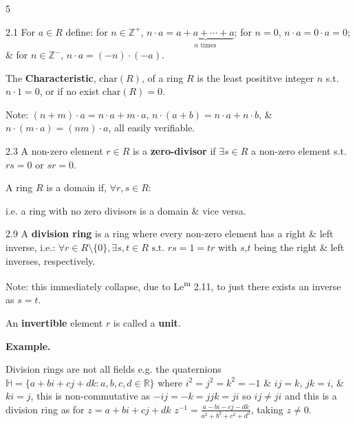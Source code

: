 \documentclass[8pt]{extarticle}
\newcommand{\fitdisplay}[1]{%
  \par\vspace{-1pt}\noindent
  \sbox{\fitdisplaybox}{#1}%
  \makebox[\columnwidth][c]{%
    \ifdim\wd\fitdisplaybox>\columnwidth
      \resizebox{\columnwidth}{!}{#1}%
    \else
      \usebox{\fitdisplaybox}%
    \fi
  }%
  \par\vspace{-1pt}%
}
\newenvironment{example}{%
  \par\noindent
  \textbf{Example.}\ \normalfont
  \ignorespaces
}{%
  \par
}
\begin{document}
\begin{multicols}{5}
        \begin{definition}{2.1}
            For \(a\in R\) define: for \(n\in\mathbb{Z}^+\), \(n\cdot a=\underbrace{a+a+\cdots+a}_{n\text{ times}}\); for \(n=0\), \(n\cdot a=0\cdot a=0\); \& for \(n\in\mathbb{Z}^-\), \(n\cdot a=(-n)\cdot(-a)\).
            
            The \textbf{Characteristic}, \(\text{char}(R)\), of a ring \(R\) is the least posititve integer \(n\) s.t. \(n\cdot 1=0\), or if no exist \(\text{char}(R)=0\).
            
            {\footnotesize Note: \((n+m)\cdot a=n\cdot a+m\cdot a\), \(n\cdot(a+b)=n\cdot a+n\cdot b\), \& \(n\cdot(m\cdot a)=(nm)\cdot a\), all easily verifiable.}
        \end{definition}

        \begin{definition}{2.3}
            A non-zero element \(r\in R\) is a \textbf{zero-divisor} if \(\exists s\in R\) a non-zero element s.t. \(rs=0\) or \(sr=0\).

            A ring \(R\) is a domain if, \(\forall r,s\in R\):

            \fitdisplay{\(rs=0\implies r=0 \text{ or } s=0.\)}

            i.e. a ring with no zero divisors is a domain \& vice versa.
        \end{definition}

        \begin{definition}{2.9}
            A \textbf{division ring} is a ring where every non-zero element has a right \& left inverse, i.e.: \(\forall r\in R\setminus\{0\},\exists s,t\in R\text{ s.t. }rs=1=tr\) with \(s\),\(t\) being the right \& left inverses, respectively.

            {\footnotesize Note: this immediately collapse, due to Le\textsuperscript{m} 2.11, to just there exists an inverse as \(s=t\).}
            
            An \textbf{invertible} element \(r\) is called a \textbf{unit}.
        \end{definition}

        \begin{example}
            Division rings are not all fields e.g. the quaternions \(\mathbb{H}=\{a+bi+cj+dk:a,b,c,d\in\mathbb{R}\}\) where \(i^2=j^2=k^2=-1\) \& \(ij=k\), \(jk=i\), \& \(ki=j\), this is non-commutative as \(-ij=-k=jjk=ji\) so \(ij\ne ji\) and this is a division ring as for \(z=a+bi+cj+dk\) \(z^{-1}=\frac{a-bi-cj-dk}{a^2+b^2+c^2+d^2}\), taking \(z\ne0\).
        \end{example}
       

\end{multicols}
\end{document}
